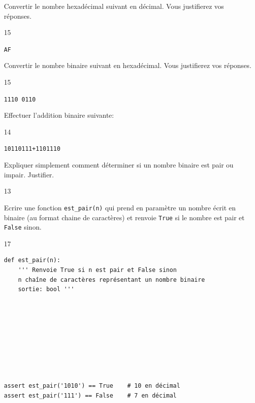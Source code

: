 \documentclass[a4paper,10pt]{report}
\def\ptsexoD{1}
\def\ptsexoE{1}
\def\ptsexoF{1}
\def\ptsexoG{2}
\def\ptsexoH{1}
\begin{document}
\medskip


\begin{minipage}{0.49\linewidth}
 \exods{\ptsexoD}

   Convertir le nombre hexadécimal suivant en décimal. Vous justifierez vos réponses.

\begin{answer}{1}{5} 
    \begin{center}
        \verb|AF|
    \end{center}   
\end{answer}
\end{minipage}\hfill
\begin{minipage}{0.49\linewidth}
     \exods{\ptsexoE}

Convertir le nombre binaire suivant en hexadécimal. Vous justifierez vos réponses.
\begin{answer}{1}{5} 
    \begin{center}
        \verb|1110 0110|
    \end{center}   
\end{answer}
\end{minipage}

\medskip

\exods{\ptsexoF}

Effectuer l'addition binaire suivante:



    \begin{answer}{1}{4} \begin{center}
        \verb|10110111+1101110|
\end{center}  \end{answer}

\pagebreak

\exods{\ptsexoG}

Expliquer simplement comment déterminer si un nombre binaire est pair ou impair. Justifier.

    \begin{answer}{1}{3}    \end{answer}




\medskip

\exods{\ptsexoH}

Ecrire une fonction \verb|est_pair(n)| qui prend en paramètre un nombre écrit en binaire (au format chaine de caractères) et renvoie \verb|True| si le nombre est pair et \verb|False| sinon.

    \begin{answer}{1}{7} 
\begin{verbatim}
def est_pair(n):
    ''' Renvoie True si n est pair et False sinon
    n chaîne de caractères représentant un nombre binaire
    sortie: bool '''









assert est_pair('1010') == True    # 10 en décimal
assert est_pair('111') == False    # 7 en décimal
    \end{verbatim}

    \end{answer}
\end{document}
